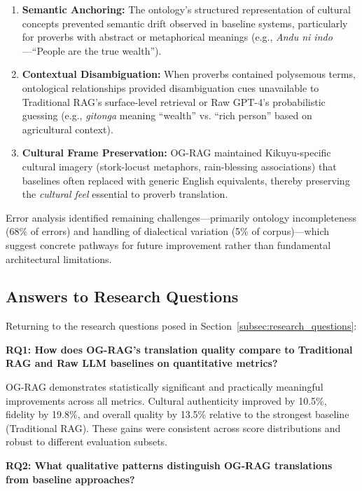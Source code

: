 \begin{enumerate}
    \item \textbf{Semantic Anchoring:} The ontology's structured representation of cultural concepts prevented semantic drift observed in baseline systems, particularly for proverbs with abstract or metaphorical meanings (e.g., \emph{Andu ni indo}—``People are the true wealth'').
    
    \item \textbf{Contextual Disambiguation:} When proverbs contained polysemous terms, ontological relationships provided disambiguation cues unavailable to Traditional RAG's surface-level retrieval or Raw GPT-4's probabilistic guessing (e.g., \emph{gitonga} meaning ``wealth'' vs. ``rich person'' based on agricultural context).
    
    \item \textbf{Cultural Frame Preservation:} OG-RAG maintained Kikuyu-specific cultural imagery (stork-locust metaphors, rain-blessing associations) that baselines often replaced with generic English equivalents, thereby preserving the \emph{cultural feel} essential to proverb translation.
\end{enumerate}

Error analysis identified remaining challenges—primarily ontology incompleteness (68\% of errors) and handling of dialectical variation (5\% of corpus)—which suggest concrete pathways for future improvement rather than fundamental architectural limitations.

\subsection{Answers to Research Questions}
\label{subsec:rq_answers}

Returning to the research questions posed in Section~\ref{subsec:research_questions}:

\textbf{RQ1: How does OG-RAG's translation quality compare to Traditional RAG and Raw LLM baselines on quantitative metrics?}

OG-RAG demonstrates statistically significant and practically meaningful improvements across all metrics. Cultural authenticity improved by 10.5\%, fidelity by 19.8\%, and overall quality by 13.5\% relative to the strongest baseline (Traditional RAG). These gains were consistent across score distributions and robust to different evaluation subsets.

\textbf{RQ2: What qualitative patterns distinguish OG-RAG translations from baseline approaches?}

